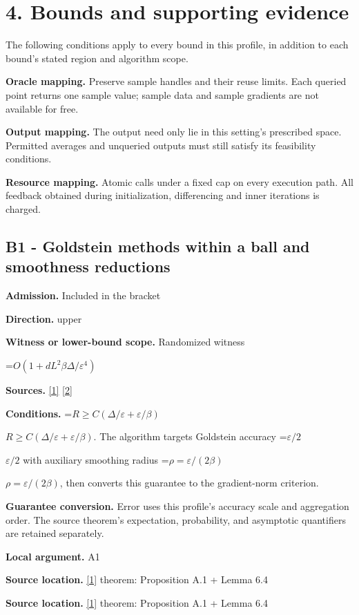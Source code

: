 \documentclass[10pt,a4paper]{article}
\newcommand{\AtlasMath}[1]{\par\begingroup\centering\setbox0=\hbox{$\displaystyle #1$}\ifdim\wd0>1.4\linewidth\typeout{ATLAS WIDE FORMULA: \the\wd0}\fi\ifdim\wd0>\linewidth\resizebox{\linewidth}{!}{\box0}\else\box0\fi\par\endgroup}
\newcommand{\AtlasInlineMath}[1]{\begingroup\setbox0=\hbox{$#1$}\ifdim\wd0>.4\linewidth\endgroup\AtlasMath{#1}\else\endgroup$#1$\fi}
\begin{document}
\section{4. Bounds and supporting evidence}
The following conditions apply to every bound in this profile, in addition to each bound's stated region and algorithm scope.

\textbf{Oracle mapping.} Preserve sample handles and their reuse limits. Each queried point returns one sample value; sample data and sample gradients are not available for free.

\textbf{Output mapping.} The output need only lie in this setting's prescribed space. Permitted averages and unqueried outputs must still satisfy its feasibility conditions.

\textbf{Resource mapping.} Atomic calls under a fixed cap on every execution path. All feedback obtained during initialization, differencing and inner iterations is charged.

\subsection{B1 - Goldstein methods within a ball and smoothness reductions}
\textbf{Admission.} Included in the bracket

\textbf{Direction.} upper

\textbf{Witness or lower-bound scope.} Randomized witness

\AtlasMath{O(1+dL^2\beta\Delta/\varepsilon^4)}
\textbf{Sources.} \href{https://arxiv.org/html/2610.00275v2}{[1]} \href{https://www.jmlr.org/papers/volume25/23-1159/23-1159.pdf}{[2]}

\textbf{Conditions.} \AtlasInlineMath{R\ge C(\Delta/\varepsilon+\varepsilon/\beta)}. The algorithm targets Goldstein accuracy \AtlasInlineMath{\varepsilon/2} with auxiliary smoothing radius \AtlasInlineMath{\rho=\varepsilon/(2\beta)}, then converts this guarantee to the gradient-norm criterion.

\textbf{Guarantee conversion.} Error uses this profile's accuracy scale and aggregation order. The source theorem's expectation, probability, and asymptotic quantifiers are retained separately.

\textbf{Local argument.} A1

\textbf{Source location.} \href{https://arxiv.org/html/2610.00275v2}{[1]} theorem: Proposition A.1 + Lemma 6.4

\textbf{Source location.} \href{https://arxiv.org/html/2610.00275v2}{[1]} theorem: Proposition A.1 + Lemma 6.4
\end{document}
